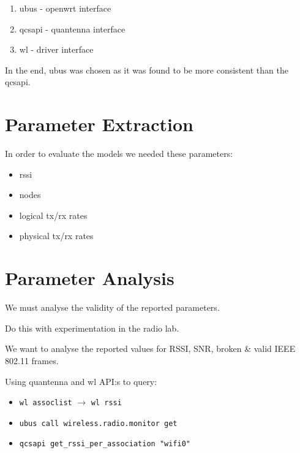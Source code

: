 \begin{enumerate}
	\item ubus - openwrt interface
	\item qcsapi - quantenna interface
	\item wl - driver interface
\end{enumerate}

In the end, ubus was chosen as it was found to be more consistent than the qcsapi.

\section{Parameter Extraction}

In order to evaluate the models we needed these parameters:

\begin{itemize}
\item rssi
\item nodes
\item logical tx/rx rates
\item physical tx/rx rates
\end{itemize}

\section{Parameter Analysis}

We must analyse the validity of the reported parameters.

Do this with experimentation in the radio lab.

We want to analyse the reported values for RSSI, SNR, broken \& valid IEEE 802.11 frames.

Using quantenna and wl API:s to query:
\begin{itemize}
    \item \texttt{wl assoclist} $\rightarrow$ \texttt{wl rssi}
    \item \texttt{ubus call wireless.radio.monitor get}
    \item \texttt{qcsapi get\_rssi\_per\_association "wifi0"}
\end{itemize}
